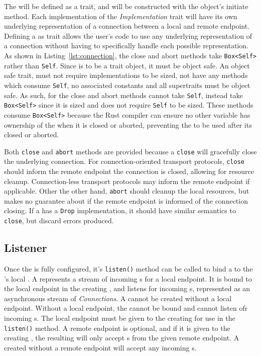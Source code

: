 The \connection{} will be defined as a trait, and will be constructed with the \preconnection{} object's
initiate method.
Each implementation of the \emph{Implementation} trait will have its own underlying representation of a connection
between a local and remote endpoint.
Defining a \connection{} as trait allows the user's code to use any underlying representation of a connection
without having to specifically handle each possible representation.
As shown in Listing~\ref{lst:connection}, the close and abort methods take \texttt{Box<Self>} rather than \texttt{Self}.
Since \connection{} is to be a trait object, it must be object safe.
An object safe trait, must not require implementations to be sized, not have any methods which consume \texttt{Self}, no
associated constants and all supertraits must be object safe.
As such, for the close and abort methods cannot take \texttt{Self}, instead take \texttt{Box<Self>} since it is sized
and does not require \texttt{Self} to be sized.
These methods consume \texttt{Box<Self>} because the Rust compiler can ensure no other variable has ownership of the
\connection{} when it is closed or aborted, preventing the \connection{} to be used after its closed or aborted.

Both \texttt{close} and \texttt{abort} methods are provided because a \texttt{close} will gracefully close the
underlying connection.
For connection-oriented transport protocols, \texttt{close} should inform the remote endpoint the connection
is closed, allowing for resource cleanup.
Connection-less transport protocols may inform the remote endpoint if applicable.
Other the other hand, \texttt{abort} should cleanup the local resources, but makes no guarantee about if the remote
endpoint is informed of the connection closing.
If a \connection{} has a \texttt{Drop} implementation, it should have similar semantics to \texttt{close}, but
discard errors produced.

\subsection{Listener}\label{subsec:listener}
Once the \preconnection{} is fully configured, it's \texttt{listen()} method can be called to bind a \listener{} to the
\preconnection{}'s local \Endpoint{}.
A \listener{} represents a stream of incoming \connection{}s for a local endpoint.
It is bound to the local endpoint in the creating \preconnection{}, and listens for incoming \connection{}s,
represented as an asynchronous stream of \emph{Connections}.
A \listener{} cannot be created without a local endpoint.
Without a local endpoint, the \listener{} cannot be bound and cannot listen ofr incoming \connection{}s.
The local endpoint must be given to the creating \preconnection{} for use in the \texttt{listen()} method.
A remote endpoint is optional, and if it is given to the creating \preconnection{}, the resulting \listener{} will only
accept \connection{}s from the given remote endpoint.
A \listener{} created without a remote endpoint will accept any incoming \connection{}s.

